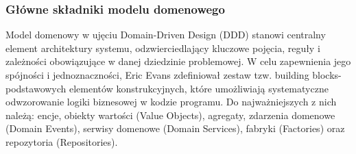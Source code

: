\subsubsection{Główne składniki modelu domenowego}
Model domenowy w ujęciu Domain-Driven Design (DDD) stanowi centralny element architektury systemu, odzwierciedlający kluczowe pojęcia, reguły i zależności obowiązujące w danej dziedzinie problemowej. W celu zapewnienia jego spójności i jednoznaczności, Eric Evans \cite{evans2004ddd} zdefiniował zestaw tzw. building blocks- podstawowych elementów konstrukcyjnych, które umożliwiają systematyczne odwzorowanie logiki biznesowej w kodzie programu. Do najważniejszych z nich należą: encje, obiekty wartości (Value Objects), agregaty, zdarzenia domenowe (Domain Events), serwisy domenowe (Domain Services), fabryki (Factories) oraz repozytoria (Repositories).

